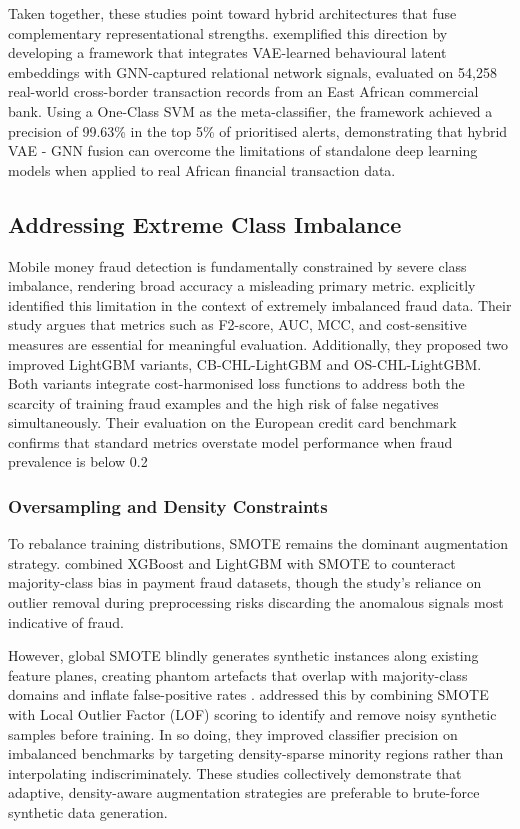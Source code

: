 \documentclass[a4paper,fleqn]{cas-sc}
\begin{document}
Taken together, these studies point toward hybrid architectures that fuse complementary representational strengths. \cite{kungu2026hybrid} exemplified this direction by developing a framework that integrates VAE-learned behavioural latent embeddings with GNN-captured relational network signals, evaluated on 54,258 real-world cross-border transaction records from an East African commercial bank. Using a One-Class SVM as the meta-classifier, the framework achieved a precision of 99.63\% in the top 5\% of prioritised alerts, demonstrating that hybrid VAE - GNN fusion can overcome the limitations of standalone deep learning models when applied to real African financial transaction data.

\subsection{Addressing Extreme Class Imbalance}

Mobile money fraud detection is fundamentally constrained by severe class imbalance, rendering broad accuracy a misleading primary metric. \cite{Zhao2024Improved} explicitly identified this limitation in the context of extremely imbalanced fraud data. Their study argues that metrics such as F2-score, AUC, MCC, and cost-sensitive measures are essential for meaningful evaluation. Additionally, they proposed two improved LightGBM variants, CB-CHL-LightGBM and OS-CHL-LightGBM. Both variants integrate cost-harmonised loss functions to address both the scarcity of training fraud examples and the high risk of false negatives simultaneously. Their evaluation on the European credit card benchmark confirms that standard metrics overstate model performance when fraud prevalence is below 0.2%

\subsubsection{Oversampling and Density Constraints}

To rebalance training distributions, SMOTE remains the dominant augmentation strategy. \cite{zheng2024advanced1} combined XGBoost and LightGBM with SMOTE to counteract majority-class bias in payment fraud datasets, though the study's reliance on outlier removal during preprocessing risks discarding the anomalous signals most indicative of fraud.

However, global SMOTE blindly generates synthetic instances along existing feature planes, creating phantom artefacts that overlap with majority-class domains and inflate false-positive rates \cite{Bonde2025Improving}. \cite{Asniar2021SMOTELOF} addressed this by combining SMOTE with Local Outlier Factor (LOF) scoring to identify and remove noisy synthetic samples before training. In so doing, they improved classifier precision on imbalanced benchmarks by targeting density-sparse minority regions rather than interpolating indiscriminately. These studies collectively demonstrate that adaptive, density-aware augmentation strategies are preferable to brute-force synthetic data generation.
\end{document}
